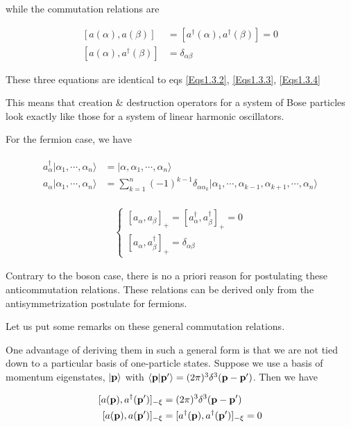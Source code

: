 while the commutation relations are 

\begin{equation}
\begin{split}
[a(\alpha),a(\beta)] &= [a^\dagger(\alpha),a^\dagger(\beta)] = 0\\
[a(\alpha),a^\dagger(\beta)] &= \delta_{\alpha\beta}
\end{split}
\end{equation}

These three equations are identical to eqs \eqref{Eqs1.3.2}, \eqref{Eqs1.3.3}, \eqref{Eqs1.3.4}

This means that creation \& destruction operators for a system of Bose particles look exactly like those for a system of linear harmonic oscillators. 

For the fermion case, we have

\begin{align}
\begin{split}
a_\alpha^\dagger|\alpha_1,\cdots,\alpha_n\rangle &= |\alpha,\alpha_1,\cdots,\alpha_n\rangle\\
a_\alpha|\alpha_1,\cdots,\alpha_n\rangle &= \sum_{k=1}^n(-1)^{k-1}\delta_{\alpha\alpha_k}|\alpha_1,\cdots,\alpha_{k-1},\alpha_{k+1},\cdots,\alpha_n\rangle
\end{split}
\end{align}

\begin{align}
\begin{cases}
[a_\alpha,a_\beta]_+ = [a_\alpha^\dagger,a_\beta^\dagger]_+ = 0\\
[a_\alpha,a_\beta^\dagger]_+ = \delta_{\alpha\beta}
\end{cases}
\end{align}

Contrary to the boson case, there is no a priori reason for postulating these anticommutation relations. These relations can be derived only from the antisymmetrization postulate for fermions. 

Let us put some remarks on these general commutation relations. 

One advantage of deriving them in such a general form is that we are not tied down to a particular basis of one-particle states. Suppose we use a basis of momentum eigenstates, $|\bf p\rangle$ with $\langle{\bf p}|{\bf p'}\rangle = (2\pi)^3\delta^3({\bf p}-{\bf p'})$. Then we have

\begin{align}
\begin{split}
[a({\bf p}),a^\dagger({\bf p'})]_{-\xi}&=(2\pi)^3\delta^3({\bf p}-{\bf p'})\\
[a({\bf p}), a({\bf p'})]_{-\xi} &= [a^\dagger({\bf p}),a^\dagger({\bf p'})]_{-\xi} = 0
\end{split}
\end{align}

